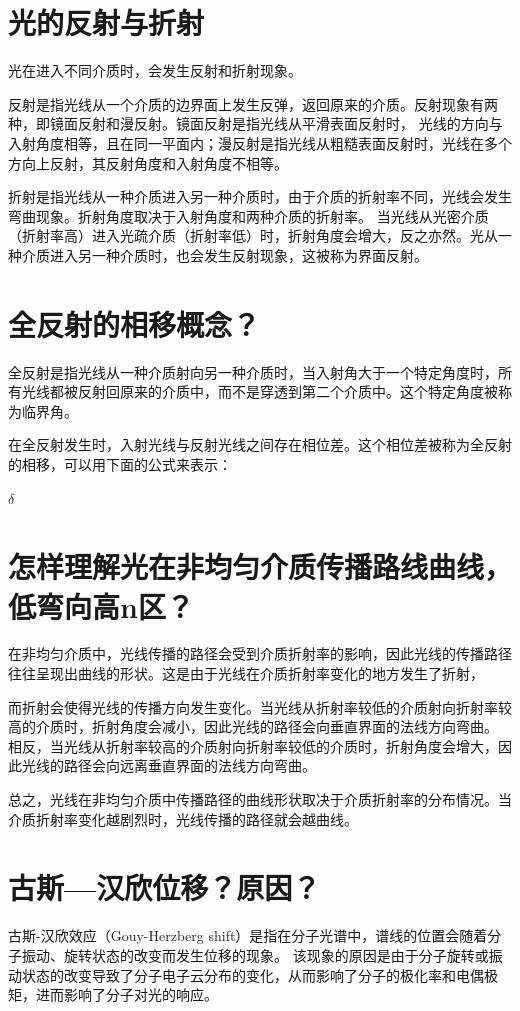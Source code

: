 \documentclass[12pt, a4paper, oneside]{article}
\begin{document}
\begin{spacing}{2.0}
\section{光的反射与折射}
光在进入不同介质时，会发生反射和折射现象。

反射是指光线从一个介质的边界面上发生反弹，返回原来的介质。反射现象有两种，即镜面反射和漫反射。镜面反射是指光线从平滑表面反射时，
光线的方向与入射角度相等，且在同一平面内；漫反射是指光线从粗糙表面反射时，光线在多个方向上反射，其反射角度和入射角度不相等。

折射是指光线从一种介质进入另一种介质时，由于介质的折射率不同，光线会发生弯曲现象。折射角度取决于入射角度和两种介质的折射率。
当光线从光密介质（折射率高）进入光疏介质（折射率低）时，折射角度会增大，反之亦然。光从一种介质进入另一种介质时，也会发生反射现象，这被称为界面反射。
\section{全反射的相移概念？}

全反射是指光线从一种介质射向另一种介质时，当入射角大于一个特定角度时，所有光线都被反射回原来的介质中，而不是穿透到第二个介质中。这个特定角度被称为临界角。

在全反射发生时，入射光线与反射光线之间存在相位差。这个相位差被称为全反射的相移，可以用下面的公式来表示：
\begin{center}
    $\delta$
\end{center}

\section{怎样理解光在非均匀介质传播路线曲线，低弯向高n区？}
在非均匀介质中，光线传播的路径会受到介质折射率的影响，因此光线的传播路径往往呈现出曲线的形状。这是由于光线在介质折射率变化的地方发生了折射，

而折射会使得光线的传播方向发生变化。当光线从折射率较低的介质射向折射率较高的介质时，折射角度会减小，因此光线的路径会向垂直界面的法线方向弯曲。
相反，当光线从折射率较高的介质射向折射率较低的介质时，折射角度会增大，因此光线的路径会向远离垂直界面的法线方向弯曲。

总之，光线在非均匀介质中传播路径的曲线形状取决于介质折射率的分布情况。当介质折射率变化越剧烈时，光线传播的路径就会越曲线。


\section{古斯—汉欣位移？原因？  }
古斯-汉欣效应（Gouy-Herzberg shift）是指在分子光谱中，谱线的位置会随着分子振动、旋转状态的改变而发生位移的现象。
该现象的原因是由于分子旋转或振动状态的改变导致了分子电子云分布的变化，从而影响了分子的极化率和电偶极矩，进而影响了分子对光的响应。


\end{spacing}
\end{document}
